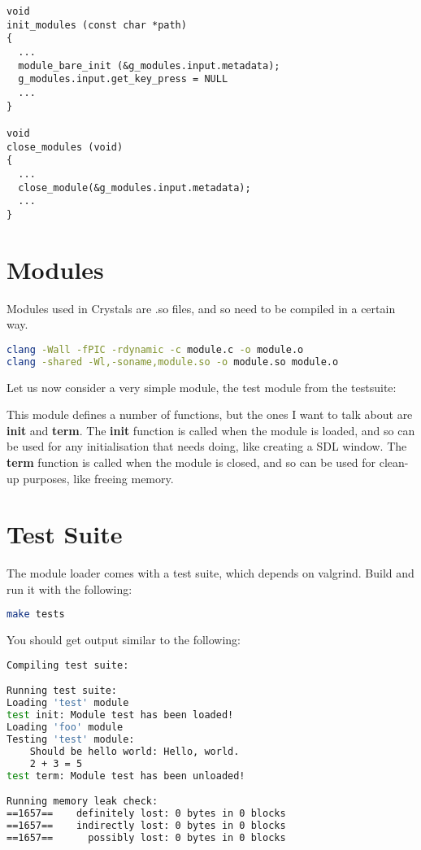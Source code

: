\documentclass[12pt,a4paper]{article}
\begin{document}
\begin{lstlisting}
void
init_modules (const char *path)
{
  ...
  module_bare_init (&g_modules.input.metadata);
  g_modules.input.get_key_press = NULL
  ...
}

void
close_modules (void)
{
  ...
  close_module(&g_modules.input.metadata);
  ...
}
\end{lstlisting}

\section{Modules}

Modules used in Crystals are .so files, and so need to be compiled in a certain way.

\begin{lstlisting}[language=bash]
clang -Wall -fPIC -rdynamic -c module.c -o module.o
clang -shared -Wl,-soname,module.so -o module.so module.o
\end{lstlisting}

Let us now consider a very simple module, the test module from the testsuite:



This module defines a number of functions, but the ones I want to talk about are \textbf{init} and \textbf{term}. The \textbf{init} function is called when the module is loaded, and so can be used for any initialisation that needs doing, like creating a SDL window. The \textbf{term} function is called when the module is closed, and so can be used for clean-up purposes, like freeing memory.

\section{Test Suite}

The module loader comes with a test suite, which depends on valgrind. Build and run it with the following:

\begin{lstlisting}[language=bash]
make tests
\end{lstlisting}

You should get output similar to the following:

\begin{lstlisting}[language=bash]
Compiling test suite:

Running test suite:
Loading 'test' module
test init: Module test has been loaded!
Loading 'foo' module
Testing 'test' module:
    Should be hello world: Hello, world.
    2 + 3 = 5
test term: Module test has been unloaded!

Running memory leak check:
==1657==    definitely lost: 0 bytes in 0 blocks
==1657==    indirectly lost: 0 bytes in 0 blocks
==1657==      possibly lost: 0 bytes in 0 blocks
\end{lstlisting}
\end{document}
